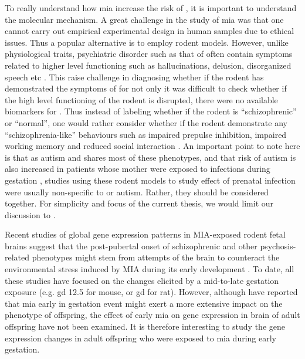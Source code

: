To really understand how \gls{mia} increase the risk of , it is important to understand the molecular mechanism.
A great challenge in the study of \gls{mia} was that one cannot carry out empirical experimental design in human samples due to ethical issues.
Thus a popular alternative is to employ rodent models.
However, unlike physiological traits, psychiatric disorder such as that of  often contain symptoms related to higher level functioning such as hallucinations, delusion, disorganized speech etc \citep{AmericanPsychiatricAssociation2013}.
This raise challenge in diagnosing whether if the rodent has demonstrated the symptoms of  for not only it was difficult to check whether if the high level functioning of the rodent is disrupted, there were no available biomarkers for .
Thus instead of labeling whether if the rodent is ``schizophrenic'' or ``normal'', one would rather consider whether if the rodent demonstrate any ``schizophrenia-like'' behaviours such as impaired prepulse inhibition, impaired working memory and reduced social interaction \citep{Meyer2007a}.
An important point to note here is that as autism and  shares most of these phenotypes, and that risk of autism is also increased in patients whose mother were exposed to infections during gestation \citep{Brown2012}, studies using these rodent models to study effect of prenatal infection were usually non-specific to  or autism. 
Rather, they should be considered together. 
For simplicity and focus of the current thesis, we would limit our discussion to .

Recent studies of global gene expression patterns in MIA-exposed rodent fetal brains \citep{Oskvig2012,Garbett2012a} suggest that the post-pubertal onset of schizophrenic and other psychosis-related phenotypes might stem from attempts of the brain to counteract the environmental stress induced by MIA during its early development \citep{Garbett2012a}. 
To date, all these studies have focused on the changes elicited by a mid-to-late gestation exposure (e.g. \gls{gd} 12.5 for mouse, or \gls{gd} for rat). 
However, although \citet{Meyer2007a,Li2009c,Li2010a} have reported that \gls{mia} early in gestation event might exert a more extensive impact on the phenotype of offspring, the effect of early \gls{mia} on gene expression in brain of adult offspring have not been examined.
It is therefore interesting to study the gene expression changes in adult offspring who were exposed to \gls{mia} during early gestation.

